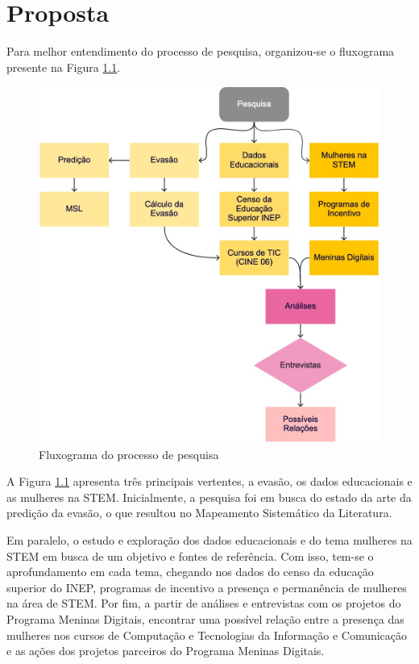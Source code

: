 \chapter{Proposta}\label{cap:Desenvolvimento}

Para melhor entendimento do processo de pesquisa, organizou-se o fluxograma presente na Figura \ref{fig:fluxogramaPesquisa}.
  
\begin{figure}[H]
\centering
\includegraphics[width=1\textwidth]{Figuras/fluxograma.png}
\caption{Fluxograma do processo de pesquisa}
\label{fig:fluxogramaPesquisa}
\end{figure}

A Figura \ref{fig:fluxogramaPesquisa} apresenta três principais vertentes, a evasão, os dados educacionais e as mulheres na STEM. Inicialmente, a pesquisa foi em busca do estado da arte da predição da evasão, o que resultou no Mapeamento Sistemático da Literatura. 


Em paralelo, o estudo e exploração dos dados educacionais e do tema mulheres na STEM em busca de um objetivo e fontes de referência. Com isso, tem-se o aprofundamento em cada tema, chegando nos dados do censo da educação superior do INEP, programas de incentivo a presença e permanência de mulheres na área de STEM. Por fim, a partir de análises e entrevistas com os projetos do Programa Meninas Digitais, encontrar uma possível relação entre a presença das mulheres nos cursos de Computação e Tecnologias da Informação e Comunicação e as ações dos projetos parceiros do Programa Meninas Digitais.


